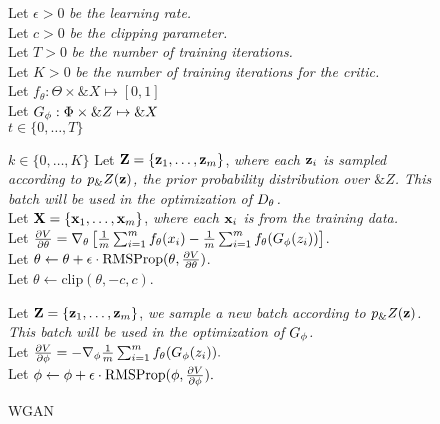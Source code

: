 \begin{figure}[H]
  \centering
  \begin{minipage}{\linewidth}
    \begin{algorithm}[H]
      Let $\epsilon > 0$ \textit{be the learning rate.} \\
      Let $c > 0$ \textit{be the clipping parameter.} \\
      Let $T > 0$ \textit{be the number of training iterations.} \\
      Let $K > 0$ \textit{be the number of training iterations for the
        critic.} \\
      Let $f_\theta: \Theta \times \&X \mapsto [0, 1]$ \\
      Let $G_\phi: \Phi \times \&Z \mapsto \&X$ \\
      \For%
      {$t \in \{0, \dots, T\}$} {
        \For%
        {$k \in \{0, \dots, K\}$} {
          Let
          $\mathbf{Z} = \{\mathbf{z}_1, \dots, \mathbf{z}_m\}$, \textit{where each
            $\mathbf{z}_i$ is sampled according to $p_\&Z(\mathbf{z})$, the prior
            probability distribution over $\&Z$.  This batch will be
            used in the optimization of
            $D_\theta$.} \\
          Let
          $\mathbf{X} = \{\mathbf{x}_1, \dots, \mathbf{x}_m\}$, \textit{where each
            $\mathbf{x}_i$ is from the training data.} \\
          Let
          ${\partial{V} \over \partial{\theta}} = \nabla_\theta\left[
            {1 \over m} \sum_{i=1}^m f_{\theta}(x_i) - {1 \over m}
            \sum_{i=1}^m f_{\theta}(G_\phi(z_i))\right]$. \\
          Let
          $\theta \gets \theta + \epsilon \cdot \text{RMSProp}(\theta,
          {\partial{V} \over \partial{\theta}})$. \\

          Let $\theta \gets \text{clip}(\theta, -c, c)$.
        }

        Let $\mathbf{Z} = \{\mathbf{z}_1, \dots, \mathbf{z}_m\}$, \textit{we sample a new
          batch according to $p_\&Z(\mathbf{z})$. This batch will be used in the
          optimization of
          $G_\phi$.} \\

        Let
        ${\partial{V} \over \partial{\phi}} = - \nabla_\phi{1 \over m}
        \sum_{i=1}^m f_{\theta}(G_\phi(z_i)).$ \\

        Let
        $\phi \gets \phi + \epsilon \cdot \text{RMSProp}(\phi,
        {\partial{V} \over \partial{\phi}}).$ \\
      }
      \caption{WGAN}
      \label{algo:wgawgann-algo}
    \end{algorithm}
  \end{minipage}
\end{figure}

